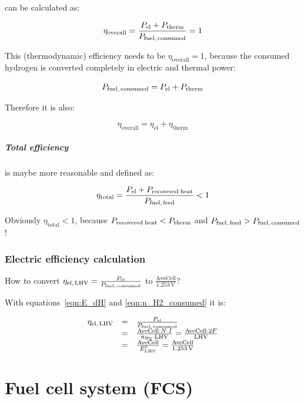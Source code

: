 \documentclass[11pt,a4paper,english,twoside]{scrreprt}
\begin{document}
can be calculated as:

\[
	\eta_\text{overall} = \frac{P_\text{el} + P_\text{therm}}{P_\text{fuel,\,consumed}} = 1 
\]

This (thermodynamic) efficiency needs to be $\eta_\text{overall}=1$, because the consumed hydrogen is converted completely in electric and thermal power:

\[
	P_\text{fuel,\,consumed} = P_\text{el} + P_\text{therm} 
\]


Therefore it is also:

\[
	\eta_\text{overall} = \eta_\text{el} + \eta_\text{therm}
\]


\paragraph{Total efficiency}

is maybe more reasonable and defined as:

\[
	\eta_\text{total} = \frac{P_\text{el} + P_\text{recovered\;heat}}{P_\text{fuel,\,feed}} < 1
\]


Obviously $\eta_\text{total} < 1$, because $P_\text{recovered\;heat} < P_\text{therm}$ and $P_\text{fuel,\,feed} > P_\text{fuel,\,consumed}$!


\subsection{Electric efficiency calculation}
\label{sec:ElEffCalc}

How to convert $\eta_\text{el,\,LHV} = \frac{P_\text{el}}{P_\text{fuel,\,consumed}}$ to $\frac{\text{AveCell}}{\SI{1.253}{\volt}}$?

With equations~\ref{eqn:E_dH} and \ref{eqn:n_H2_consumed} it is:

\[
\begin{array}{lcl}
	\eta_\text{el,\,LHV} &=& \frac{P_\text{el}}{P_\text{fuel,\,consumed}} \\
	&=& \frac{\text{AveCell}\cdot N\cdot I}{\dot{n}_{\ce{H2}} \cdot \text{LHV}} = \frac{\text{AveCell}\cdot 2F}{\text{LHV}} \\
	&=& \frac{\text{AveCell}}{E_\text{LHV}^{0}} = \frac{\text{AveCell}}{\SI{1.253}{\volt}} 
\end{array}
\]


\chapter{Fuel cell system (FCS)}
\end{document}

